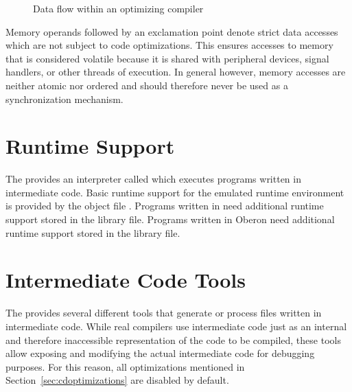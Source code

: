\begin{figure}
\caption{Data flow within an optimizing compiler}
\label{fig:cdoptdataflow}
\end{figure}

Memory operands followed by an exclamation point denote strict data accesses which are not subject to code optimizations.
This ensures accesses to memory that is considered volatile because it is shared with peripheral devices, signal handlers, or other threads of execution.
In general however, memory accesses are neither atomic nor ordered and should therefore never be used as a synchronization mechanism.

\section{Runtime Support}

The \ecs{} provides an interpreter called  which executes programs written in intermediate code.
Basic runtime support for the emulated runtime environment is provided by the object file .
Programs written in \cpp{} need additional runtime support stored in the  library file.
Programs written in Oberon need additional runtime support stored in the  library file.
\seecpp\seeoberon

\section{Intermediate Code Tools}\label{sec:cdtools}

The \ecs{} provides several different tools that generate or process files written in intermediate code.
While real compilers use intermediate code just as an internal and therefore inaccessible representation of the code to be compiled,
these tools allow exposing and modifying the actual intermediate code for debugging purposes.
For this reason, all optimizations mentioned in Section~\ref{sec:cdoptimizations} are disabled by default.
\interface\renewcommand{\debuggingtool}{}

\cdcheck
\cdopt
\cdrun
\cdamda
\cdamdb
\cdamdc
\cdarma
\cdarmb
\cdarmc
\cdarmcfpe
\cdavr
\cdavrtt
\cdmabk
\cdmibl
\cdmipsa
\cdmipsb
\cdmmix
\cdorok
\cdppca
\cdppcb
\cdrisc
\cdwasm
\cdxtensa
\cppcode
\falcode
\obcode

\concludechapter
